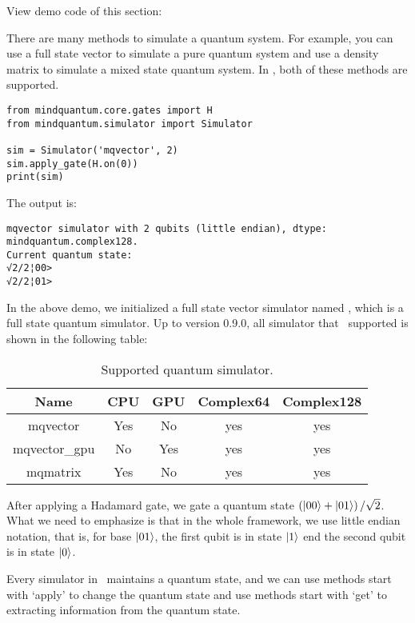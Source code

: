 View demo code of this section: 

There are many methods to simulate a quantum system. For example, you can use a full state vector to simulate a pure quantum system and use a density matrix to simulate a mixed state quantum system. In \MindQuantum, both of these methods are supported.

\begin{lstlisting}
from mindquantum.core.gates import H
from mindquantum.simulator import Simulator

sim = Simulator('mqvector', 2)
sim.apply_gate(H.on(0))
print(sim)
\end{lstlisting}
The output is:

\begin{lstlisting}
mqvector simulator with 2 qubits (little endian), dtype: mindquantum.complex128.
Current quantum state:
√2/2¦00>
√2/2¦01>
\end{lstlisting}

In the above demo, we initialized a full state vector simulator named , which is a full state quantum simulator. Up to version 0.9.0, all simulator that \MindQuantum\ supported is shown in the following table:
\begin{table}[ht]
    \begin{tabular}{ccccc}
        \toprule
        Name          & CPU & GPU & Complex64 & Complex128 \\
        \midrule
        mqvector      & Yes & No  & yes       & yes        \\
        mqvector\_gpu & No  & Yes & yes       & yes        \\
        mqmatrix      & Yes & No  & yes       & yes        \\
        \bottomrule
    \end{tabular}
    \caption{Supported quantum simulator.}
    \label{tab:simulator_supported}
\end{table}
After applying a Hadamard gate, we gate a quantum state $\left(\ket{00}+\ket{01}\right)/\sqrt{2}$. What we need to emphasize is that in the whole framework, we use little endian notation, that is, for base $\ket{01}$, the first qubit is in state $\ket{1}$ end the second qubit is in state $\ket{0}$.

Every simulator in \MindQuantum\ maintains a quantum state, and we can use methods start with `apply' to change the quantum state and use methods start with `get' to extracting information from the quantum state.

